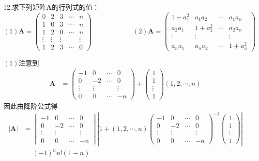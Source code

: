 12.求下列矩阵$\bm{A}$的行列式的值：
\[
(1)\bm{A}=\begin{pmatrix}
	0&2&3&\cdots&n\\
	1&0&3&\cdots&n\\
	1&2&0&\cdots&n\\
	\vdots&\vdots&\vdots&&\vdots\\
	1&2&3&\cdots&0
\end{pmatrix}\qquad\qquad\qquad
(2)\bm{A}=\begin{pmatrix}
	1+a_1^2&a_1a_2&\cdots&a_1a_n\\
	a_2a_1&1+a_2^2&\cdots&a_2a_n\\
	\vdots&\vdots&&\vdots\\
	a_na_1&a_na_2&\cdots&1+a_n^2
\end{pmatrix}
\]
\begin{solution}
$(1)$注意到\begin{align*}
\bm{A}&=\begin{pmatrix}
	-1&0&\cdots&0\\
	0&-2&\cdots&0\\
	\vdots&\vdots&&\vdots\\
	0&0&\cdots&-n
\end{pmatrix}+\begin{pmatrix}
	1\\1\\\vdots\\1
\end{pmatrix}\left(1,2,\cdots,n\right)
\end{align*}
因此由降阶公式得
\begin{align*}
	\left|\bm{A}\right|&=\begin{vmatrix}
		-1&0&\cdots&0\\
	0&-2&\cdots&0\\
	\vdots&\vdots&&\vdots\\
	0&0&\cdots&-n
	\end{vmatrix}\left|
		1+\left(1,2,\cdots,n\right)\begin{pmatrix}
			-1&0&\cdots&0\\
	0&-2&\cdots&0\\
	\vdots&\vdots&&\vdots\\
	0&0&\cdots&-n
		\end{pmatrix}^{-1}\begin{pmatrix}
			1\\1\\\vdots\\1
		\end{pmatrix}
	\right|\\
	&=\left(-1\right)^nn!\left(1-n\right)
\end{align*}


\end{solution}
